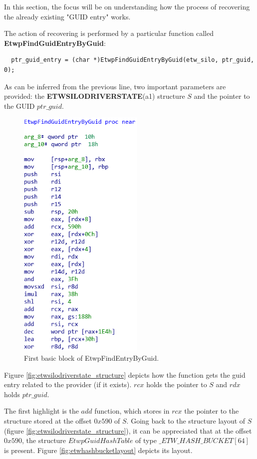   In this section, the focus will be on understanding how the process of recovering the already existing "GUID entry" works.

  The action of recovering is performed by a particular function called {\bfseries EtwpFindGuidEntryByGuid}:

  \begin{verbatim}
  ptr_guid_entry = (char *)EtwpFindGuidEntryByGuid(etw_silo, ptr_guid, 0);
  \end{verbatim}

  As can be inferred from the previous line, two important parameters are provided: the {\bfseries ETWSILODRIVERSTATE}(a1) structure $S$ and the pointer to the GUID $ptr\_guid$.

  \begin{centering}
  \begin{figure}[H]
    \includegraphics[width=6cm]{images/etwpfindentrybyguid1.png}
    \caption[]{First basic block of EtwpFindEntryByGuid.}
    \label{fig:EtwpFindEntryByGuid}
  \end{figure}
  \end{centering}

  Figure \ref{fig:etwsilodriverstate_structure} depicts how the function gets the guid entry related to the provider (if it exists). $rcx$ holds the pointer to $S$ and $rdx$ holds $ptr\_guid$.

  The first highlight is the $add$ function, which stores in $rcx$ the pointer to the structure stored at the offset $0x590$ of $S$. Going back to the structure layout of $S$ (figure \ref{fig:etwsilodriverstate_structure}), it can be appreciated that at the offset $0x590$, the structure $EtwpGuidHashTable$ of type $\_ETW\_HASH\_BUCKET[64]$ is present. Figure \ref{fig:etwhashbucketlayout} depicts its layout.

